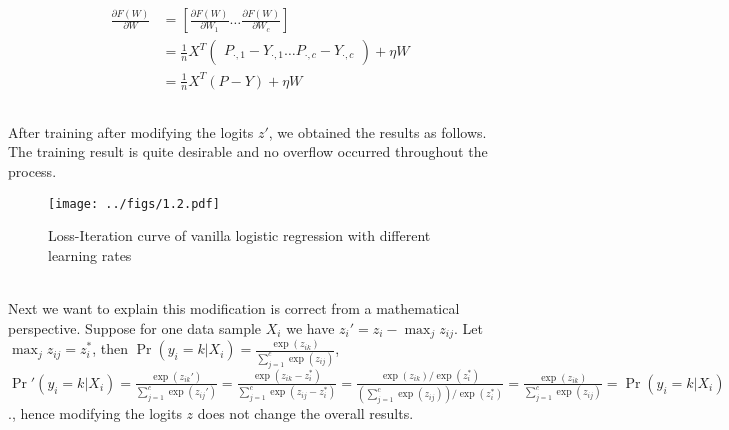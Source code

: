 \documentclass{article}
\begin{document}
        \begin{align*}
            \frac{\partial F(W)}{\partial W}
            &=\left[\frac{\partial F(W)}{\partial W_{1}}\dots \frac{\partial F(W)}{\partial W_{c}}\right]\\
            &=\frac{1}{n}X^T\begin{pmatrix}
                P_{\cdot,1}-Y_{\cdot,1}\dots P_{\cdot,c}-Y_{\cdot,c}
            \end{pmatrix}+\eta W\\
            &=\frac{1}{n}X^T(P-Y)+\eta W
        \end{align*}

        \subsection{}
        After training after modifying the logits $z'$, we obtained the results as follows. 
        The training result is quite desirable and no overflow occurred throughout the process.
        \begin{figure}[hbt!]
            \centering
            \texttt{[image: ../figs/1.2.pdf]}
            \caption{Loss-Iteration curve of vanilla logistic regression with different learning rates}
            \label{fig:1.2}
        \end{figure}\\
        Next we want to explain this modification is correct from a mathematical perspective. 
        Suppose for one data sample $X_i$ we have $z_i'=z_i-\max_{j}z_{ij}$.  Let $\max_{j}z_{ij}=z_{i}^{*}$, then $\Pr(y_i=k|X_i)=\frac{\exp(z_{ik})}{\sum_{j=1}^{c}\exp(z_{ij})}$,
        $\Pr'(y_i=k|X_i)=\frac{\exp(z_{ik}')}{\sum_{j=1}^{c}\exp(z_{ij}')}=\frac{\exp(z_{ik}-z_{i}^{*})}{\sum_{j=1}^{c}\exp(z_{ij}-z_{i}^{*})}
        =\frac{\exp(z_{ik})/\exp(z_{i}^{*})}{\left(\sum_{j=1}^{c}\exp(z_{ij})\right)/\exp(z_{i}^{*})}=\frac{\exp(z_{ik})}{\sum_{j=1}^{c}\exp(z_{ij})}=\Pr(y_i=k|X_i)$.,
        hence modifying the logits $z$ does not change the overall results.
        
\end{document}
